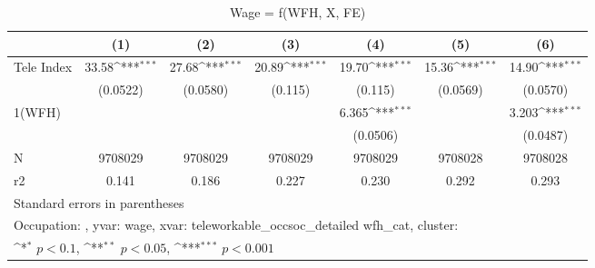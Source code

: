 \begin{table}[htbp]\centering
\def\sym#1{\ifmmode^{#1}\else\(^{#1}\)\fi}
\caption{Wage = f(WFH, X, FE)}
\begin{tabular}{l*{6}{c}}
\hline\hline
                    &\multicolumn{1}{c}{(1)}         &\multicolumn{1}{c}{(2)}         &\multicolumn{1}{c}{(3)}         &\multicolumn{1}{c}{(4)}         &\multicolumn{1}{c}{(5)}         &\multicolumn{1}{c}{(6)}         \\
\hline
Tele Index          &       33.58\sym{***}&       27.68\sym{***}&       20.89\sym{***}&       19.70\sym{***}&       15.36\sym{***}&       14.90\sym{***}\\
                    &    (0.0522)         &    (0.0580)         &     (0.115)         &     (0.115)         &    (0.0569)         &    (0.0570)         \\
1(WFH)              &                     &                     &                     &       6.365\sym{***}&                     &       3.203\sym{***}\\
                    &                     &                     &                     &    (0.0506)         &                     &    (0.0487)         \\
\hline
N                   &     9708029         &     9708029         &     9708029         &     9708029         &     9708028         &     9708028         \\
r2                  &       0.141         &       0.186         &       0.227         &       0.230         &       0.292         &       0.293         \\
\hline\hline
\multicolumn{7}{l}{\footnotesize Standard errors in parentheses}\\
\multicolumn{7}{l}{\footnotesize Occupation: , yvar: wage, xvar: teleworkable\_occsoc\_detailed wfh\_cat, cluster: }\\
\multicolumn{7}{l}{\footnotesize \sym{*} \(p<0.1\), \sym{**} \(p<0.05\), \sym{***} \(p<0.001\)}\\
\end{tabular}
\end{table}
